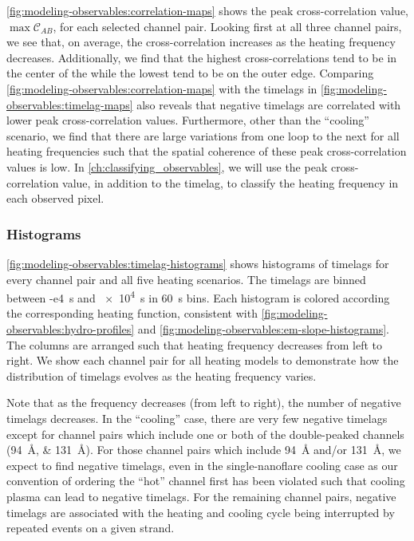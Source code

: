 \autoref{fig:modeling-observables:correlation-maps} shows the peak cross-correlation value, $\max\mathcal{C}_{AB}$, for each selected channel pair. Looking first at all three channel pairs, we see that, on average, the cross-correlation increases as the heating frequency decreases. Additionally, we find that the highest cross-correlations tend to be in the center of the \AR{} while the lowest tend to be on the outer edge. Comparing \autoref{fig:modeling-observables:correlation-maps} with the timelags in \autoref{fig:modeling-observables:timelag-maps} also reveals that negative timelags are correlated with lower peak cross-correlation values. Furthermore, other than the ``cooling'' scenario, we find that there are large variations from one loop to the next for all heating frequencies such that the spatial coherence of these peak cross-correlation values is low. In \autoref{ch:classifying_observables}, we will use the peak cross-correlation value, in addition to the timelag, to classify the heating frequency in each observed pixel.

\subsubsection{Histograms}\label{sec:modeling-observables:histograms}

\autoref{fig:modeling-observables:timelag-histograms} shows histograms of timelags for every channel pair and all five heating scenarios. The timelags are binned between \SI{-e4}{\second} and \SI{e4}{\second} in \SI{60}{\second} bins. Each histogram is colored according the corresponding heating function, consistent with \autoref{fig:modeling-observables:hydro-profiles} and \autoref{fig:modeling-observables:em-slope-histograms}. The columns are arranged such that heating frequency decreases from left to right. We show each channel pair for all heating models to demonstrate how the distribution of timelags evolves as the heating frequency varies.

Note that as the frequency decreases (from left to right), the number of negative timelags decreases. In the ``cooling'' case, there are very few negative timelags except for channel pairs which include one or both of the double-peaked channels (\SIlist{94;131}{\angstrom}). For those channel pairs which include \SI{94}{\angstrom} and/or \SI{131}{\angstrom}, we expect to find negative timelags, even in the single-nanoflare cooling case as our convention of ordering the ``hot'' channel first has been violated such that cooling plasma can lead to negative timelags. For the remaining channel pairs, negative timelags are associated with the heating and cooling cycle being interrupted by repeated events on a given strand.


